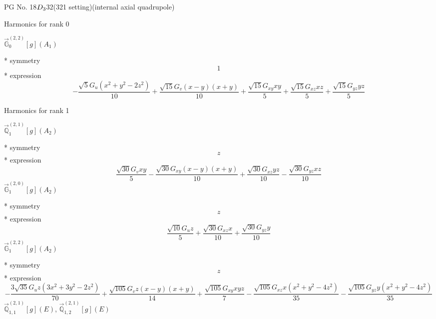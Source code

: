 \documentclass[fleqn,8pt]{jsarticle}
\begin{document}
\setcounter{MaxMatrixCols}{32}

\renewcommand{\tablename}{Table~}
\renewcommand{\figurename}{Figure~}
\begin{center}
\LARGE
PG No. 18\quad$D_{\rm 3}$\quad$32$\quad(321 setting)\quad[ trigonal ] (internal axial quadrupole)
\end{center}

\noindent * Harmonics for rank 0

\noindent\quad $\vec{\mathbb{G}}_{0}^{(2,2)}[g](A_{1})$

\noindent\quad ** symmetry
\begin{dmath*}
1
\end{dmath*}
\noindent\quad ** expression
\begin{dmath*}
- \frac{\sqrt{5} G_{u} \left(x^{2} + y^{2} - 2 z^{2}\right)}{10} + \frac{\sqrt{15} G_{v} \left(x - y\right) \left(x + y\right)}{10} + \frac{\sqrt{15} G_{xy} x y}{5} + \frac{\sqrt{15} G_{xz} x z}{5} + \frac{\sqrt{15} G_{yz} y z}{5}
\end{dmath*}

\noindent * Harmonics for rank 1

\noindent\quad $\vec{\mathbb{Q}}_{1}^{(2,1)}[g](A_{2})$

\noindent\quad ** symmetry
\begin{dmath*}
z
\end{dmath*}
\noindent\quad ** expression
\begin{dmath*}
\frac{\sqrt{30} G_{v} x y}{5} - \frac{\sqrt{30} G_{xy} \left(x - y\right) \left(x + y\right)}{10} + \frac{\sqrt{30} G_{xz} y z}{10} - \frac{\sqrt{30} G_{yz} x z}{10}
\end{dmath*}
\noindent\quad $\vec{\mathbb{G}}_{1}^{(2,0)}[g](A_{2})$

\noindent\quad ** symmetry
\begin{dmath*}
z
\end{dmath*}
\noindent\quad ** expression
\begin{dmath*}
\frac{\sqrt{10} G_{u} z}{5} + \frac{\sqrt{30} G_{xz} x}{10} + \frac{\sqrt{30} G_{yz} y}{10}
\end{dmath*}
\noindent\quad $\vec{\mathbb{G}}_{1}^{(2,2)}[g](A_{2})$

\noindent\quad ** symmetry
\begin{dmath*}
z
\end{dmath*}
\noindent\quad ** expression
\begin{dmath*}
- \frac{3 \sqrt{35} G_{u} z \left(3 x^{2} + 3 y^{2} - 2 z^{2}\right)}{70} + \frac{\sqrt{105} G_{v} z \left(x - y\right) \left(x + y\right)}{14} + \frac{\sqrt{105} G_{xy} x y z}{7} - \frac{\sqrt{105} G_{xz} x \left(x^{2} + y^{2} - 4 z^{2}\right)}{35} - \frac{\sqrt{105} G_{yz} y \left(x^{2} + y^{2} - 4 z^{2}\right)}{35}
\end{dmath*}
\noindent\quad $\vec{\mathbb{Q}}_{1,1}^{(2,1)}[g](E)$, $\vec{\mathbb{Q}}_{1,2}^{(2,1)}[g](E)$
\end{document}
